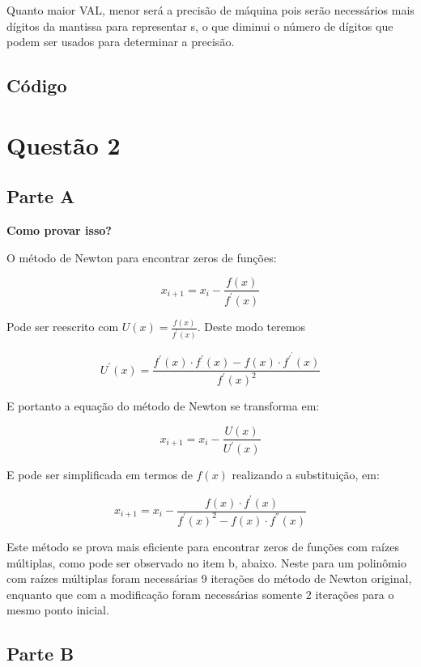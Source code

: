 \documentclass[12pt,a4paper,final]{article}
\begin{document}
Quanto maior VAL, menor será a precisão de máquina pois serão necessários
mais dígitos da mantissa para representar s, o que diminui o número
de dígitos que podem ser usados para determinar a precisão.

\subsection{Código}



\section{Questão 2}

\subsection{Parte A}

\textbf{Como provar isso?}

O método de Newton para encontrar zeros de funções:

\[ x_{i+1} = x_i - \frac{f(x)}{f^{'}(x)} \]

Pode ser reescrito com $U(x) = \frac{f(x)}{f^{'}(x)}$. Deste modo teremos

\[ U^{'}(x) = \frac{f^{'}(x) \cdot f^{'}(x) - f(x) \cdot f^{'}^{'}(x)}{f^{'}(x)^2} \]

E portanto a equação do método de Newton se transforma em:

\[ x_{i+1} = x_i - \frac{U(x)}{U^{'}(x)} \]

E pode ser simplificada em termos de $f(x)$ realizando a substituição, em:

\[ x_{i+1} = x_i - \frac{f(x) \cdot f^{'}(x)}{f^{'}(x)^2 - f(x) \cdot f^{''}(x)} \]

Este método se prova mais eficiente para encontrar zeros de funções com raízes múltiplas,
como pode ser observado no item b, abaixo. Neste para um polinômio com raízes múltiplas
foram necessárias 9 iterações do método de Newton original, enquanto que com a modificação
foram necessárias somente 2 iterações para o mesmo ponto inicial.


\subsection{Parte B}
\end{document}

